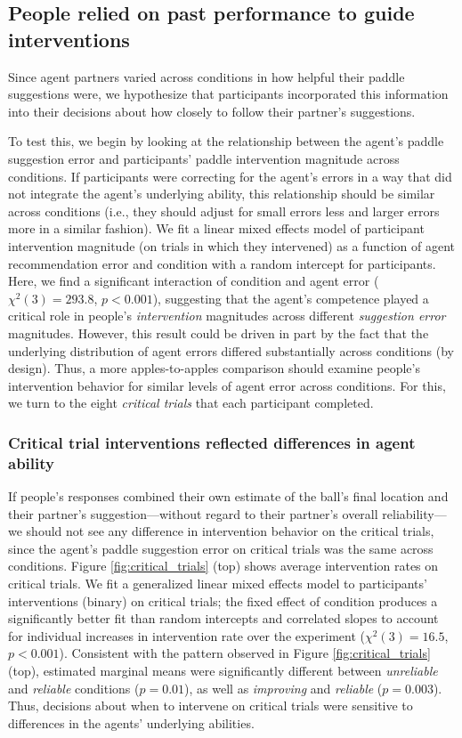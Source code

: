 \documentclass[10pt,letterpaper]{article}
\begin{document}
\subsection{People relied on past performance to guide interventions}

Since agent partners varied across conditions in how helpful their paddle suggestions were, we hypothesize that participants incorporated this information into their decisions about how closely to follow their partner's suggestions. 

To test this, we begin by looking at the relationship between the agent's paddle suggestion error and participants' paddle intervention magnitude across conditions. If participants were correcting for the agent's errors in a way that did not integrate the agent's underlying ability, this relationship should be similar across conditions (i.e., they should adjust for small errors less and larger errors more in a similar fashion). We fit a linear mixed effects model of participant intervention magnitude (on trials in which they intervened) as a function of agent recommendation error and condition with a random intercept for participants. Here, we find a significant interaction of condition and agent error ($\chi^2(3) = 293.8$, $p < 0.001$), suggesting that the agent's competence played a critical role in people's \textit{intervention} magnitudes across different \textit{suggestion error} magnitudes. However, this result could be driven in part by the fact that the underlying distribution of agent errors differed substantially across conditions (by design). Thus, a more apples-to-apples comparison should examine people's intervention behavior for similar levels of agent error across conditions. For this, we turn to the eight \textit{critical trials} that each participant completed.

\subsubsection{Critical trial interventions reflected differences in agent ability}

If people's responses combined their own estimate of the ball's final location and their partner's suggestion---without regard to their partner's overall reliability---we should not see any difference in intervention behavior on the critical trials, since the agent's paddle suggestion error on critical trials was the same across conditions. Figure \ref{fig:critical_trials} (top) shows average intervention rates on critical trials. We fit a generalized linear mixed effects model to participants' interventions (binary) on critical trials; the fixed effect of condition produces a significantly better fit than random intercepts and correlated slopes to account for individual increases in intervention rate over the experiment ($\chi^2(3) = 16.5$, $p < 0.001$). Consistent with the pattern observed in Figure \ref{fig:critical_trials} (top), estimated marginal means were significantly different between \textit{unreliable} and \textit{reliable} conditions ($p = 0.01$), as well as \textit{improving} and \textit{reliable} ($p = 0.003$). Thus, decisions about when to intervene on critical trials were sensitive to differences in the agents' underlying abilities.
\end{document}
